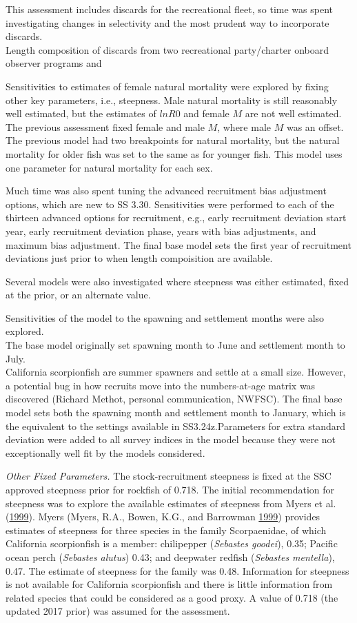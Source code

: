 \documentclass[12pt,]{article}
\begin{document}
This assessment includes discards for the recreational fleet, so time
was spent investigating changes in selectivity and the most prudent way
to incorporate discards.\\
Length composition of discards from two recreational party/charter
onboard observer programs and

Sensitivities to estimates of female natural mortality were explored by
fixing other key parameters, i.e., steepness. Male natural mortality is
still reasonably well estimated, but the estimates of \(lnR0\) and
female \(M\) are not well estimated. The previous assessment fixed
female and male \(M\), where male \(M\) was an offset. The previous
model had two breakpoints for natural mortality, but the natural
mortality for older fish was set to the same as for younger fish. This
model uses one parameter for natural mortality for each sex.

Much time was also spent tuning the advanced recruitment bias adjustment
options, which are new to SS 3.30. Sensitivities were performed to each
of the thirteen advanced options for recruitment, e.g., early
recruitment deviation start year, early recruitment deviation phase,
years with bias adjustments, and maximum bias adjustment. The final base
model sets the first year of recruitment deviations just prior to when
length compoisition are available.

Several models were also investigated where steepness was either
estimated, fixed at the prior, or an alternate value.

Sensitivities of the model to the spawning and settlement months were
also explored.\\
The base model originally set spawning month to June and settlement
month to July.\\
California scorpionfish are summer spawners and settle at a small size.
However, a potential bug in how recruits move into the numbers-at-age
matrix was discovered (Richard Methot, personal communication, NWFSC).
The final base model sets both the spawning month and settlement month
to January, which is the equivalent to the settings available in
SS3.24z.Parameters for extra standard deviation were added to all survey
indices in the model because they were not exceptionally well fit by the
models considered.

\emph{Other Fixed Parameters.} The stock-recruitment steepness is fixed
at the SSC approved steepness prior for rockfish of 0.718. The initial
recommendation for steepness was to explore the available estimates of
steepness from Myers et al. (\protect\hyperlink{ref-Myers1999}{1999}).
Myers (Myers, R.A., Bowen, K.G., and Barrowman
\protect\hyperlink{ref-Myers1999}{1999}) provides estimates of steepness
for three species in the family Scorpaenidae, of which California
scorpionfish is a member: chilipepper (\emph{Sebastes goodei}), 0.35;
Pacific ocean perch (\emph{Sebastes alutus}) 0.43; and deepwater redfish
(\emph{Sebastes mentella}), 0.47. The estimate of steepness for the
family was 0.48. Information for steepness is not available for
California scorpionfish and there is little information from related
species that could be considered as a good proxy. A value of 0.718 (the
updated 2017 prior) was assumed for the assessment.
\end{document}
